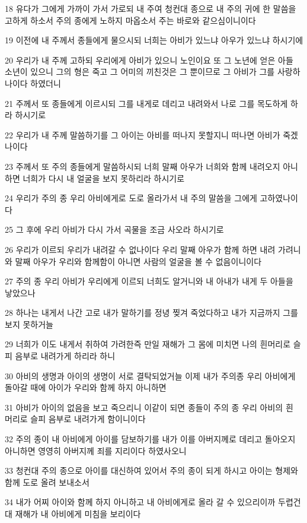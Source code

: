\par 18 유다가 그에게 가까이 가서 가로되 내 주여 청컨대 종으로 내 주의 귀에 한 말씀을 고하게 하소서 주의 종에게 노하지 마옵소서 주는 바로와 같으심이니이다
\par 19 이전에 내 주께서 종들에게 물으시되 너희는 아비가 있느냐 아우가 있느냐 하시기에
\par 20 우리가 내 주께 고하되 우리에게 아비가 있으니 노인이요 또 그 노년에 얻은 아들 소년이 있으니 그의 형은 죽고 그 어미의 끼친것은 그 뿐이므로 그 아비가 그를 사랑하나이다 하였더니
\par 21 주께서 또 종들에게 이르시되 그를 내게로 데리고 내려와서 나로 그를 목도하게 하라 하시기로
\par 22 우리가 내 주께 말씀하기를 그 아이는 아비를 떠나지 못할지니 떠나면 아비가 죽겠나이다
\par 23 주께서 또 주의 종들에게 말씀하시되 너희 말째 아우가 너희와 함께 내려오지 아니하면 너희가 다시 내 얼굴을 보지 못하리라 하시기로
\par 24 우리가 주의 종 우리 아비에게로 도로 올라가서 내 주의 말씀을 그에게 고하였나이다
\par 25 그 후에 우리 아비가 다시 가서 곡물을 조금 사오라 하시기로
\par 26 우리가 이르되 우리가 내려갈 수 없나이다 우리 말째 아우가 함께 하면 내려 가려니와 말째 아우가 우리와 함께함이 아니면 사람의 얼굴을 볼 수 없음이니이다
\par 27 주의 종 우리 아비가 우리에게 이르되 너희도 알거니와 내 아내가 내게 두 아들을 낳았으나
\par 28 하나는 내게서 나간 고로 내가 말하기를 정녕 찢겨 죽었다하고 내가 지금까지 그를 보지 못하거늘
\par 29 너희가 이도 내게서 취하여 가려한즉 만일 재해가 그 몸에 미치면 나의 흰머리로 슬피 음부로 내려가게 하리라 하니
\par 30 아비의 생명과 아이의 생명이 서로 결탁되었거늘 이제 내가 주의종 우리 아비에게 돌아갈 때에 아이가 우리와 함께 하지 아니하면
\par 31 아비가 아이의 없음을 보고 죽으리니 이같이 되면 종들이 주의 종 우리 아비의 흰 머리로 슬피 음부로 내려가게 함이니이다
\par 32 주의 종이 내 아비에게 아이를 담보하기를 내가 이를 아버지께로 데리고 돌아오지 아니하면 영영히 아버지께 죄를 지리이다 하였사오니
\par 33 청컨대 주의 종으로 아이를 대신하여 있어서 주의 종이 되게 하시고 아이는 형제와 함께 도로 올려 보내소서
\par 34 내가 어찌 아이와 함께 하지 아니하고 내 아비에게로 올라 갈 수 있으리이까 두렵건대 재해가 내 아비에게 미침을 보리이다

